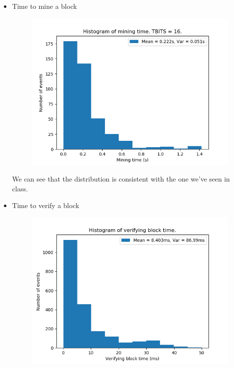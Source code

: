 \documentclass[10pt]{homework}
\begin{document}
\begin{itemize}
  \item Time to mine a block
  \begin{figure}[htbp]
    \centering
    \includegraphics[scale = 0.8]{../plot/mining_time_16.png}
  \end{figure}

  We can see that the distribution is consistent with the one we've seen in class.
  \item Time to verify a block
  \begin{figure}[htbp]
    \centering
    \includegraphics[scale = 0.8]{../plot/verifying_block_time.png}
  \end{figure}
\end{itemize}
\end{document}
